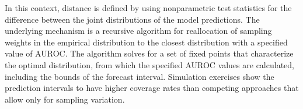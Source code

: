 In this context, distance is defined by using nonparametric test statistics for the difference between the joint distributions of the model predictions.
The underlying mechanism is a recursive algorithm for reallocation of sampling weights in the empirical distribution to the closest distribution with a specified value of AUROC.
The algorithm solves for a set of fixed points that characterize the optimal distribution,
from which the specified AUROC values are calculated, including the bounds of the forecast interval.
%
%
%
Simulation exercises show the prediction intervals to have higher coverage rates than competing approaches that allow only for sampling variation.



%
%
%

